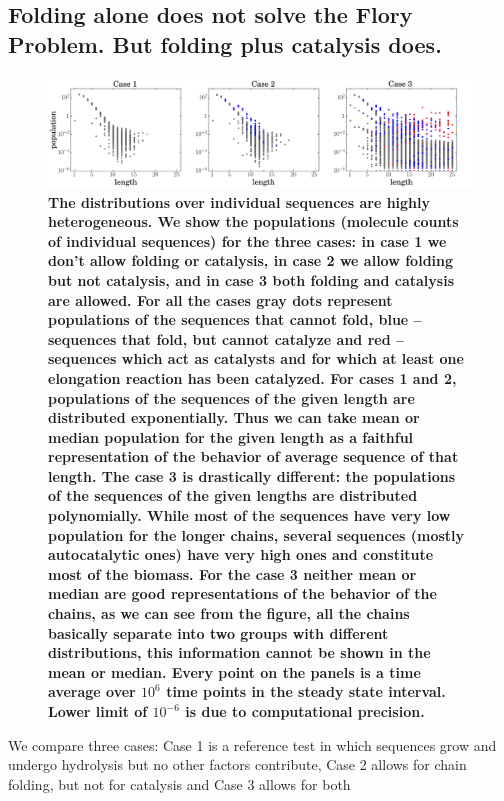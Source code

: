 \documentclass[5p,times]{elsarticle}
\begin{document}
\subsection{Folding alone does not solve the Flory Problem.  But folding plus catalysis does.}
\begin{figure}[htb!]
  \centering
  \includegraphics[width=\textwidth]{pictures/scatter-all-three.pdf}
  \caption{\footnotesize{\textbf{\bf{The distributions over individual sequences are highly 
heterogeneous.}  We show the populations (molecule counts of individual 
sequences) for the three cases: in case 1 we don't allow folding or catalysis, in case 2 
we allow folding but not catalysis, and in case 3 both folding and catalysis are allowed. For 
all the cases gray dots represent populations of the sequences that cannot fold, 
blue -- sequences that fold, but cannot 
catalyze and red -- sequences which act as catalysts and for which at least one elongation 
reaction 
has been catalyzed.  For cases 1 and 2, populations of the sequences of the given length are 
distributed exponentially. Thus we can take mean or median population for the given length as a 
faithful representation of the behavior of average sequence of that length. The case 3 is 
drastically different: the populations of the sequences of the given lengths are distributed 
polynomially. While most of the sequences have very low population for the longer chains, 
several sequences (mostly autocatalytic ones) have very high ones and constitute most of the 
biomass. 
For the case 3 neither mean or median are good representations of the behavior of the chains, 
as we can see from the figure, all the chains basically separate into two groups with different 
distributions, this information cannot be shown in the mean or median.  Every 
point on the panels is a time average over $10^6$ time points in the steady state interval. Lower 
limit of $10^{-6}$ is due to computational precision.}}}
  \label{fig:stats-scatter-018}
\end{figure}
 We compare three cases:  Case 1 is a reference test in which sequences grow and undergo 
hydrolysis 
but no other factors 
contribute, Case 2 allows for chain folding, but not for catalysis and Case 3 allows for both 
\end{document}
